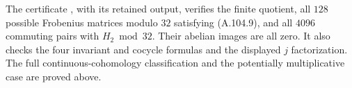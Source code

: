 The certificate
,
with its retained output, verifies the finite
quotient, all $128$ possible Frobenius matrices
modulo $32$ satisfying (A.104.9), and all $4096$
commuting pairs with $H_2\bmod32$.
Their abelian images are all zero.
It also checks the four invariant and cocycle
formulas and the displayed $j$ factorization.
The full continuous-cohomology classification
and the potentially multiplicative case are
proved above.
